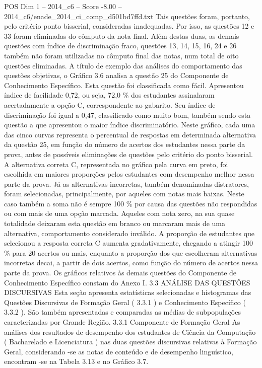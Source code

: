 \begin{textsample}{POS Dim 1 – 2014\_c6 – Score -8.00 – 2014\_c6/enade\_2014\_ci\_comp\_d501bd7ffd.txt}
Tais questões foram, portanto, pelo critério ponto bisserial, consideradas inadequadas.
Por isso, as questões 12 e 33 foram eliminadas do cômputo da nota final.
Além destas duas, as demais questões com índice de discriminação fraco, questões 13, 14, 15, 16, 24 e 26 também não foram utilizadas no cômputo final das notas, num total de oito questões eliminadas.
A título de exemplo das análises do comportamento das questões objetivas, o Gráfico 3.6 analisa a questão 25 do Componente de Conhecimento Específico.
Esta questão foi classificada como fácil.
Apresentou índice de facilidade 0,72, ou seja, 72,0 \% dos estudantes assinalaram acertadamente a opção C, correspondente ao gabarito.
Seu índice de discriminação foi igual a 0,47, classificado como muito bom, também sendo esta questão a que apresentou o maior índice discriminatório.
Neste gráfico, cada uma das cinco curvas representa o percentual de respostas em determinada alternativa da questão 25, em função do número de acertos dos estudantes nessa parte da prova, antes de possíveis eliminações de questões pelo critério do ponto bisserial.
A alternativa correta C, representada no gráfico pela curva em preto, foi escolhida em maiores proporções pelos estudantes com desempenho melhor nessa parte da prova.
Já as alternativas incorretas, também denominadas distratores, foram selecionadas, principalmente, por aqueles com notas mais baixas.
Neste caso também a soma não é sempre 100 \% por causa das questões não respondidas ou com mais de uma opção marcada.
Aqueles com nota zero, na sua quase totalidade deixaram esta questão em branco ou marcaram mais de uma alternativa, comportamento considerado inválido.
A proporção de estudantes que selecionou a resposta correta C aumenta gradativamente, chegando a atingir 100 \% para 20 acertos ou mais, enquanto a proporção dos que escolheram alternativas incorretas decai, a partir de dois acertos, como função do número de acertos nessa parte da prova.
Os gráficos relativos às demais questões do Componente de Conhecimento Específico constam do Anexo I. 3.3 ANÁLISE DAS QUESTÕES DISCURSIVAS Esta seção apresenta estatísticas selecionadas e histogramas das Questões Discursivas de Formação Geral ( 3.3.1 ) e Conhecimento Específico ( 3.3.2 ).
São também apresentadas e comparadas as médias de subpopulações caracterizadas por Grande Região. 3.3.1 Componente de Formação Geral As análises dos resultados de desempenho dos estudantes de Ciência da Computação ( Bacharelado e Licenciatura ) nas duas questões discursivas relativas à Formação Geral, considerando -se as notas de conteúdo e de desempenho linguístico, encontram -se na Tabela 3.13 e no Gráfico 3.7.

\end{textsample}
